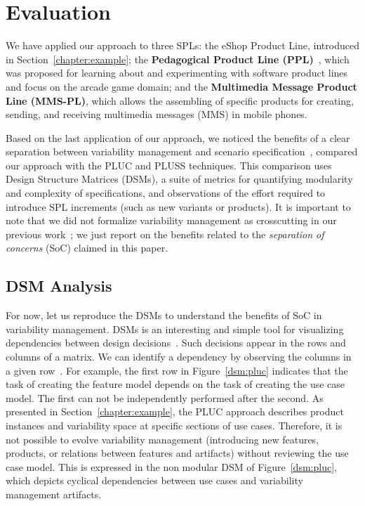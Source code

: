 \documentclass[11pt]{report}
\begin{document}
\section{Evaluation}
\label{sec:evaluation}

We have applied our approach to three SPLs: the eShop Product Line, introduced in Section~\ref{chapter:example}; the  
{\bf Pedagogical Product Line (PPL)}~\cite{ppl-url}, which was proposed for learning about and experimenting with software product lines and focus on the arcade game domain; and the 
{\bf Multimedia Message Product Line (MMS-PL)}, which allows the assembling of specific products for creating, sending, and receiving multimedia messages (MMS) in mobile phones.

Based on the last application of our approach, we noticed the benefits of a clear
separation between variability management and scenario
specification~\cite{rbonifacio-ea-2008}, compared our approach with the PLUC and
PLUSS techniques. This comparison uses Design Structure Matrices (DSMs), a suite
of metrics for quantifying modularity and complexity of specifications, and
observations of the effort required to introduce SPL increments (such as new
variants or products). It is important to note that we did not formalize
variability management as crosscutting in our previous
work~\cite{rbonifacio-ea-2008}; we just report on the benefits related to the
\emph{separation of concerns} (SoC) claimed in this paper.

\subsection{DSM Analysis}
For now, let us reproduce the DSMs to understand the benefits of SoC in
variability management. DSMs is an interesting and simple tool for visualizing
dependencies between design decisions~\cite{clark-design-rules-book}. Such
decisions appear in the rows and columns of a matrix. We can identify a
dependency by observing the columns in a given
row~\cite{clark-design-rules-book}. For example, the first row in
Figure~\ref{dsm:pluc} indicates that the task of creating the feature model
depends on the task of creating the use case model. The first can not be
independently performed after the second. As presented in
Section~\ref{chapter:example}, the PLUC approach describes product instances and
variability space at specific sections of use cases. Therefore, it is not
possible to evolve variability management (introducing new features, products, or
relations between features and artifacts) without reviewing the use case model. 
This is expressed in the non modular DSM of Figure~\ref{dsm:pluc}, which depicts
cyclical dependencies between use cases and variability management artifacts.
\end{document}
